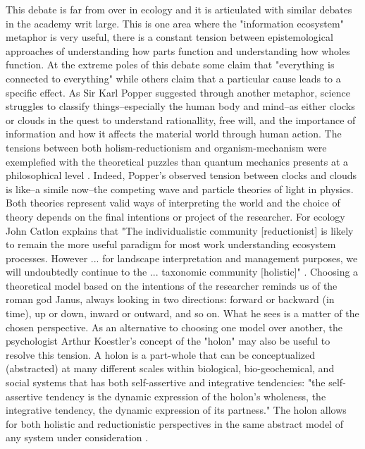 This debate is far from over in ecology and it is articulated with similar debates in the academy writ large. This is one area where the "information ecosystem" metaphor is very useful, there is a constant tension between epistemological approaches of understanding how  parts function and understanding how wholes function. At the extreme poles of this debate some claim that "everything is connected to everything" while others claim that a particular cause leads to a specific effect. As Sir Karl Popper suggested through another metaphor, science struggles to classify things--especially the human body and mind--as either clocks or clouds in the quest to understand rationallity, free will, and the importance of information and how it affects the material world through human action. The tensions between both holism-reductionism and organism-mechanism were exemplefied with the theoretical puzzles than quantum mechanics presents at a philosophical level \cite{popper_1966}. Indeed, Popper's observed tension between clocks and clouds is like--a simile now--the competing wave and particle theories of light in physics. Both theories represent valid ways of interpreting the world and the choice of theory depends on the final intentions or project of the researcher. For ecology John Catlon explains that "The individualistic community [reductionist] is likely to remain the more useful paradigm for most work understanding ecosystem processes. However ... for landscape interpretation and management purposes, we will undoubtedly continue to the ... taxonomic community [holistic]" \cite[Cantlon 1996, cited in ][p. 241]{barbour_1996}. Choosing a theoretical model based on the intentions of the researcher reminds us of the roman god Janus, always looking in two directions: forward or backward (in time), up or down, inward or outward, and so on. What he sees is a matter of the chosen perspective. As an alternative to choosing one model over another, the psychologist Arthur Koestler's concept of the "holon" may also be useful to resolve this tension. A holon is a part-whole that can be conceptualized (abstracted) at many different scales within biological, bio-geochemical, and social systems that has both self-assertive and integrative tendencies: "the self-assertive tendency is the dynamic expression of the holon's wholeness, the integrative tendency, the dynamic expression of its partness." The holon allows for both holistic and reductionistic perspectives in the same abstract model of any system under consideration \cite[][p. 56] {koestler_1967}.

